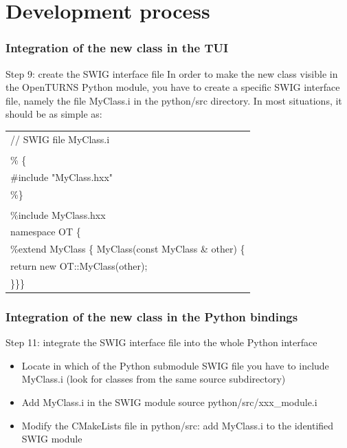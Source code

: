 \documentclass[8pt]{beamer}
\begin{document}
\section[Development process]{Development process}
\begin{frame}
  \frametitle{Integration of the new class in the TUI}
  \begin{block}{Step 9: create the SWIG interface file}
    In order to make the new class visible in the OpenTURNS Python module, you have to create a specific SWIG interface file, namely the file MyClass.i in the python/src directory. In most situations, it should be as simple as:
    \small
    \begin{tabular}{l}
      \ttfamily // SWIG file MyClass.i \\
      \ttfamily  \\
      \ttfamily \% \{ \\
      \ttfamily \#include "MyClass.hxx" \\
      \ttfamily \%\} \\
      \ttfamily  \\
      \ttfamily \%include MyClass.hxx \\
      \ttfamily namespace OT \{ \\
      \ttfamily \%extend MyClass \{ MyClass(const MyClass \& other) \{ \\
      \ttfamily return new OT::MyClass(other); \\
      \ttfamily \}\}\}
    \end{tabular}
    \normalsize
  \end{block}
\end{frame}
\begin{frame}
  \frametitle{Integration of the new class in the Python bindings}
  \begin{block}{Step 11: integrate the SWIG interface file into the whole Python interface}
    \begin{itemize}
    \item Locate in which of the Python submodule SWIG file you have to include MyClass.i (look for classes from the same source subdirectory) 
    \item Add MyClass.i in the SWIG module source python/src/xxx\_module.i
    \item Modify the CMakeLists file in python/src: add MyClass.i to the identified SWIG module
    \end{itemize}
  \end{block}
\end{frame}
\end{document}

